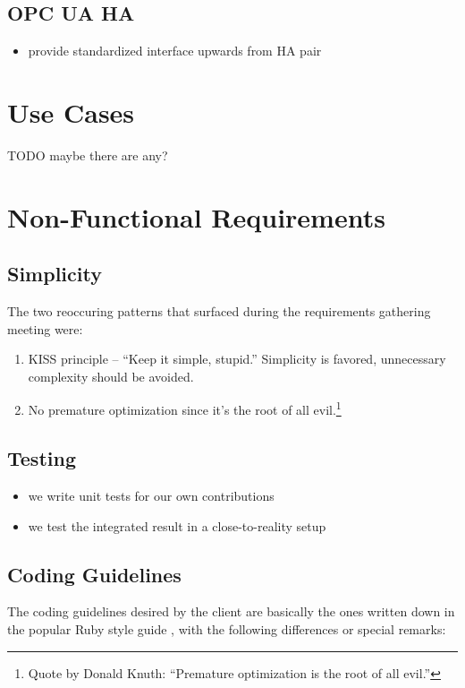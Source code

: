\subsection{OPC UA HA}
\begin{itemize}
	\item provide standardized interface upwards from HA pair
\end{itemize}

\section{Use Cases}
TODO maybe there are any?

\section{Non-Functional Requirements}
\subsection{Simplicity}
The two reoccuring patterns that surfaced during the requirements gathering
meeting were:

\begin{enumerate}
\item KISS principle -- ``Keep it simple, stupid.'' Simplicity is favored,
	unnecessary complexity should be avoided.

\item No premature optimization since it's the root of all evil.\footnote{Quote
	by Donald Knuth: ``Premature optimization is the root of all evil.''}
\end{enumerate}


\subsection{Testing}
\begin{itemize}
	\item we write unit tests for our own contributions
	\item we test the integrated result in a close-to-reality setup
\end{itemize}


\subsection{Coding Guidelines}
The coding guidelines desired by the client are basically the ones written down
in the popular Ruby style guide \cite{rb:style-guide}, with the following
differences or special remarks:

